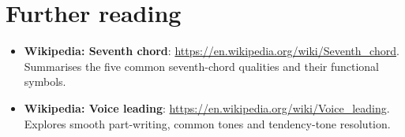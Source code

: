 \section*{Further reading}
\begin{itemize}
  \item \textbf{Wikipedia: Seventh chord}: \url{https://en.wikipedia.org/wiki/Seventh_chord}. Summarises the five common seventh-chord qualities and their functional symbols.
  \item \textbf{Wikipedia: Voice leading}: \url{https://en.wikipedia.org/wiki/Voice_leading}. Explores smooth part-writing, common tones and tendency-tone resolution.
\end{itemize}
